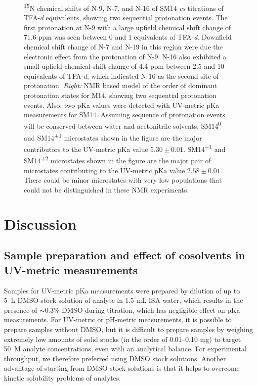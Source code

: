 \documentclass[9pt,lineno]{elife}
\begin{document}
\begin{figure}
\begin{center}
{\textsuperscript{15}N chemical shifts of N-9, N-7, and N-16 of SM14 \textit{vs} titrations of TFA-\textit{d} equivalents, showing two sequential protonation events. The first protonation at N-9 with a large upfield chemical shift change of 71.6 ppm was seen between 0 and 1 equivalents of TFA-\textit{d}. Downfield chemical shift change of N-7 and N-19 in this region were due the electronic effect from the protonation of N-9. N-16 also exhibited a small upfield chemical shift change of 4.4 ppm between 2.5 and 10 equivalents of TFA-\textit{d}, which indicated N-16 as the second site of protonation. \textit{Right:} NMR based model of the order of dominant protonation states for M14, showing two sequential protonation events. Also, two pKa values were detected with UV-metric pKa measurements for SM14. Assuming sequence of protonation events will be conserved between water and acetonitrile solvents, SM14\textsuperscript{0} and SM14\textsuperscript{+1} microstates shown in the figure are the major contributors to the UV-metric pKa value $5.30 \pm 0.01$. SM14\textsuperscript{+1} and SM14\textsuperscript{+2} microstates shown in the figure are the major pair of microstates contributing to the UV-metric pKa value $2.58 \pm 0.01$. There could be minor microstates with very low populations that could not be distinguished in these NMR experiments.
}
\label{fig:NMR_microstates}
\end{center}
\end{figure}


\section{Discussion}

\subsection{Sample preparation and effect of cosolvents in UV-metric measurements}

Samples for UV-metric pKa measurements were prepared by dilution of up to 5~\micro L DMSO stock solution of analyte in 1.5 mL ISA water, which results in the presence of $\sim$0.3\% DMSO during titration, which has negligible effect on pKa measurements. 
For UV-metric or pH-metric measurements, it is possible to prepare samples without DMSO, but it is difficult to prepare samples by weighing extremely low amounts of solid stocks (in the order of 0.01--0.10 mg) to target 50~{\micro}M analyte concentrations, even with an analytical balance. 
For experimental throughput, we therefore preferred using DMSO stock solutions. 
Another advantage of starting from DMSO stock solutions is that it helps to overcome kinetic solubility problems of analytes.
\end{document}
